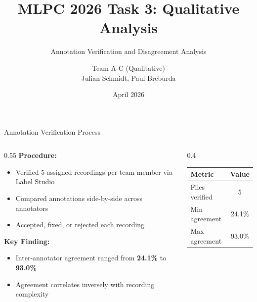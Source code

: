 \documentclass[aspectratio=169]{beamer}
\title{MLPC 2026 Task 3: Qualitative Analysis}
\subtitle{Annotation Verification and Disagreement Analysis}
\author{Team A-C (Qualitative) \\ Julian Schmidt, Paul Breburda}
\date{April 2026}
\begin{document}
\begin{frame}
  \titlepage
\end{frame}

\begin{frame}{Annotation Verification Process}
  \begin{columns}[T]
    \begin{column}{0.55\textwidth}
      \textbf{Procedure:}
      \begin{itemize}
        \item Verified 5 assigned recordings per team member via Label Studio
        \item Compared annotations side-by-side across annotators
        \item Accepted, fixed, or rejected each recording
      \end{itemize}
      \vspace{0.5em}
      \textbf{Key Finding:}
      \begin{itemize}
        \item Inter-annotator agreement ranged from \textbf{24.1\%} to \textbf{93.0\%}
        \item Agreement correlates inversely with recording complexity
      \end{itemize}
    \end{column}
    \begin{column}{0.4\textwidth}
      \centering
      \small
      \begin{tabular}{lc}
        \toprule
        Metric & Value \\
        \midrule
        Files verified & 5 \\
        Min agreement & 24.1\% \\
        Max agreement & 93.0\% \\
        \bottomrule
      \end{tabular}
    \end{column}
  \end{columns}
\end{frame}
\end{document}
